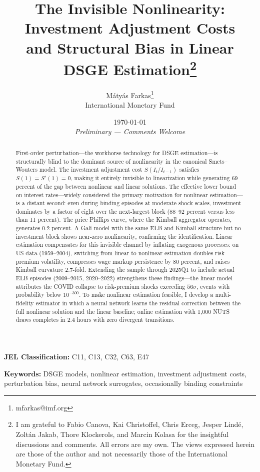 \documentclass[12pt]{article}
\title{\textbf{The Invisible Nonlinearity: Investment Adjustment Costs \\ and Structural Bias in Linear DSGE Estimation}\thanks{I am grateful to Fabio Canova, Kai Christoffel, Chris Erceg, Jesper Lind\'e, Zolt\'an Jakab, Thore Klockerols, and Marcin Kolasa for the insightful discussions and comments.  All errors are my own. The views expressed herein are those of the author and not necessarily those of the International Monetary Fund.}}
\author{Mátyás Farkas\thanks{mfarkas@imf.org}\\
\small International Monetary Fund}
\date{\today\\
\small \textit{Preliminary --- Comments Welcome}}
\theoremstyle{plain}
\theoremstyle{definition}
\theoremstyle{remark}
\begin{document}
\maketitle
\vspace{-1cm}
\begin{abstract}
\noindent
\footnotesize
First-order perturbation---the workhorse technology for DSGE estimation---is structurally blind to the dominant source of nonlinearity in the canonical Smets--Wouters model. The investment adjustment cost $S(I_t/I_{t-1})$ satisfies $S(1) = S'(1) = 0$, making it entirely invisible to linearization while generating 69 percent of the gap between nonlinear and linear solutions. The effective lower bound on interest rates---widely considered the primary motivation for nonlinear estimation---is a distant second: even during binding episodes at moderate shock scales, investment dominates by a factor of eight over the next-largest block (88--92 percent versus less than 11 percent). The price Phillips curve, where the Kimball aggregator operates, generates 0.2 percent. A Gal\'i model with the same ELB and Kimball structure but no investment block shows near-zero nonlinearity, confirming the identification. Linear estimation compensates for this invisible channel by inflating exogenous processes: on US data (1959--2004), switching from linear to nonlinear estimation doubles risk premium volatility, compresses wage markup persistence by 80 percent, and raises Kimball curvature 2.7-fold. Extending the sample through 2025Q1 to include actual ELB episodes (2009--2015, 2020--2022) strengthens these findings---the linear model attributes the COVID collapse to risk-premium shocks exceeding $56\sigma$, events with probability below $10^{-300}$. To make nonlinear estimation feasible, I develop a multi-fidelity estimator in which a neural network learns the residual correction between the full nonlinear solution and the linear baseline; online estimation with 1,000 NUTS draws completes in 2.4 hours with zero divergent transitions.
\end{abstract}

\medskip
\noindent \textbf{JEL Classification:} C11, C13, C32, C63, E47

\noindent \textbf{Keywords:} DSGE models, nonlinear estimation, investment adjustment costs, perturbation bias, neural network surrogates, occasionally binding constraints

\clearpage

\tableofcontents
\clearpage

\end{document}
